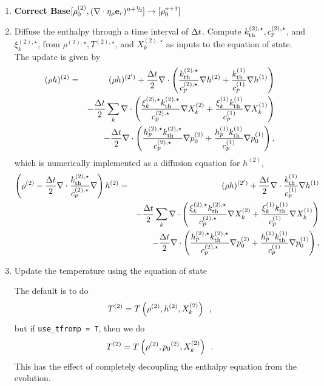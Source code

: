\begin{description}
\begin{enumerate}
\begin{enumerate}
\begin{description}
\end{description}

\end{enumerate}

\item {\bf Correct Base}$[\rho_0^{(2)}, (\nabla\cdot\etarho\er)^{\nph}] \rightarrow [\rho_0^{n+1}]$

\item Diffuse the enthalpy through a time interval of $\Delta t$.  Compute $k_{\rm th}^{(2),\star}, c_p^{(2),\star}$, and $\xi_k^{(2),\star}$, from $\rho^{(2),\star}, T^{(2),\star}$, and $X_k^{(2),\star}$ as inputs to the equation of state.  The update is given by
\begin{eqnarray}
(\rho h)^{(2)} &=& (\rho h)^{(2')} + \frac{\Delta t}{2}\nabla\cdot\left(\frac{k_{\rm th}^{(2),\star}}{c_p^{(2),\star}}\nabla h^{(2)} + \frac{k_{\rm th}^{(1)}}{c_p^{(1)}}\nabla h^{(1)}\right)\nonumber\\
&&- \frac{\Delta t}{2}\sum_k\nabla\cdot\left(\frac{\xi_k^{(2),\star}k_{\rm th}^{(2),\star}}{c_p^{(2),\star}}\nabla X_k^{(2)} + \frac{\xi_k^{(1)}k_{\rm th}^{(1)}}{c_p^{(1)}}\nabla X_k^{(1)}\right)\nonumber\\
&&- \frac{\Delta t}{2}\nabla\cdot\left(\frac{h_p^{(2),\star}k_{\rm th}^{(2),\star}}{c_p^{(2),\star}}\nabla p_0^{(2)} + \frac{h_p^{(1)}k_{\rm th}^{(1)}}{c_p^{(1)}}\nabla p_0^{(1)}\right),
\end{eqnarray}
which is numerically implemented as a diffusion equation for $h^{(2)}$,
\begin{eqnarray}
\left(\rho^{(2)} - \frac{\Delta t}{2}\nabla\cdot\frac{k_{\rm th}^{(2),\star}}{c_p^{(2),\star}}\nabla\right)h^{(2)} &=& (\rho h)^{(2')} + \frac{\Delta t}{2}\nabla\cdot\frac{k_{\rm th}^{(1)}}{c_p^{(1)}}\nabla h^{(1)}\nonumber\\
&&- \frac{\Delta t}{2}\sum_k\nabla\cdot\left(\frac{\xi_k^{(2),\star}k_{\rm th}^{(2),\star}}{c_p^{(2),\star}}\nabla X_k^{(2)} + \frac{\xi_k^{(1)}k_{\rm th}^{(1)}}{c_p^{(1)}}\nabla X_k^{(1)}\right)\nonumber\\
&&- \frac{\Delta t}{2}\nabla\cdot\left(\frac{h_p^{(2),\star}k_{\rm th}^{(2),\star}}{c_p^{(2),\star}}\nabla p_0^{(2)} + \frac{h_p^{(1)}k_{\rm th}^{(1)}}{c_p^{(1)}}\nabla p_0^{(1)}\right),
\end{eqnarray}
\item Update the temperature using the equation of state

The default is to do
\begin{equation}
T^{(2)} = T\left(\rho^{(2)}, h^{(2)}, X_k^{(2)}\right) \enskip ,
\end{equation}
but if {\tt use\_tfromp = T}, then we do
\begin{equation}
T^{(2)} = T\left(\rho^{(2)}, {p_0}^{(2)}, X_k^{(2)}\right) \enskip .
\end{equation}
This has the effect of completely decoupling the enthalpy equation from the 
evolution.


\end{enumerate}
\end{description}
